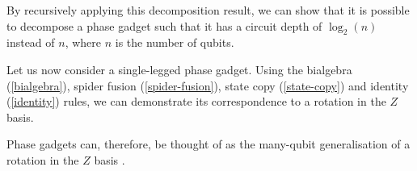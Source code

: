 By recursively applying this decomposition result, we can show that it is possible to decompose a phase gadget such that it has a circuit depth of $\log_2(n)$ instead of $n$, where $n$ is the number of qubits.


Let us now consider a single-legged phase gadget. Using the bialgebra (\ref{bialgebra}), spider fusion (\ref{spider-fusion}), state copy (\ref{state-copy}) and identity (\ref{identity}) rules, we can demonstrate its correspondence to a rotation in the $Z$ basis.

\label{phase-gadget-single-leg}

Phase gadgets can, therefore, be thought of as the many-qubit generalisation of a rotation in the $Z$ basis \cite{Yeung2020}. 

